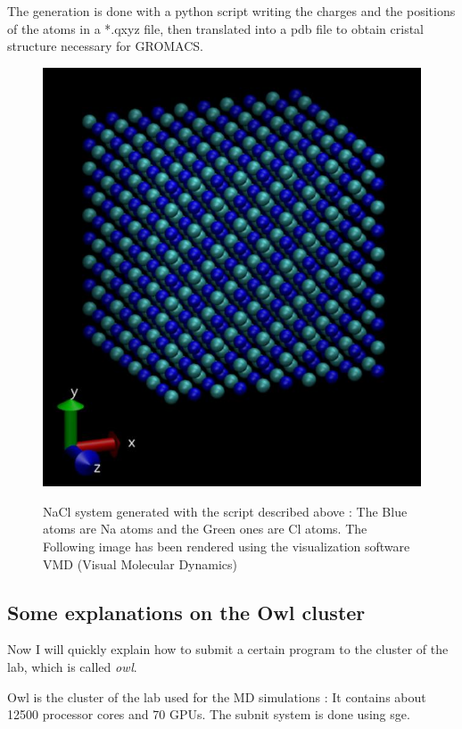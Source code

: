 \documentclass[11pt,twoside,a4paper]{report}
\begin{document}
The generation is done with a python script writing the charges and the positions of the atoms in a *.qxyz file, then translated into a pdb file to obtain cristal structure necessary for GROMACS.

\begin{figure}[H]
	   \includegraphics[scale=0.4]{nacl}
	   \label{fig:nacl_system}
    \centering 
    \caption{NaCl system generated with the script described above : The Blue atoms are Na atoms and the Green ones are Cl atoms. The Following image has been rendered using the visualization software VMD (Visual Molecular Dynamics)}    
   \end{figure}  


\subsection{Some explanations on the Owl cluster}

Now I will quickly explain how to submit a certain program to the cluster of the lab, which is called \textit{owl}.

Owl is the cluster of the lab used for the MD simulations : It contains about 12500 processor cores and 70 GPUs. The subnit system is done using sge.  
\end{document}
